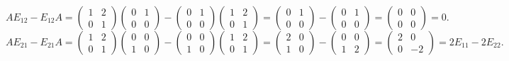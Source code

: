 \documentclass[french]{yLectureNote}
\begin{document}
$$AE_{12} - E_{12}A = \begin{pmatrix} 1 & 2 \\ 0 & 1 \end{pmatrix} \begin{pmatrix} 0 & 1 \\ 0 & 0 \end{pmatrix} - \begin{pmatrix} 0 & 1 \\ 0 & 0 \end{pmatrix} \begin{pmatrix} 1 & 2 \\ 0 & 1 \end{pmatrix} = \begin{pmatrix} 0 & 1 \\ 0 & 0 \end{pmatrix} - \begin{pmatrix} 0 & 1 \\ 0 & 0 \end{pmatrix} = \begin{pmatrix} 0 & 0 \\ 0 & 0 \end{pmatrix} = 0.$$
$$AE_{21} - E_{21}A = \begin{pmatrix} 1 & 2 \\ 0 & 1 \end{pmatrix} \begin{pmatrix} 0 & 0 \\ 1 & 0 \end{pmatrix} - \begin{pmatrix} 0 & 0 \\ 1 & 0 \end{pmatrix} \begin{pmatrix} 1 & 2 \\ 0 & 1 \end{pmatrix} = \begin{pmatrix} 2 & 0 \\ 1 & 0 \end{pmatrix} - \begin{pmatrix} 0 & 0 \\ 1 & 2 \end{pmatrix} = \begin{pmatrix} 2 & 0 \\ 0 & -2 \end{pmatrix} = 2E_{11} - 2E_{22}.$$
\end{document}
